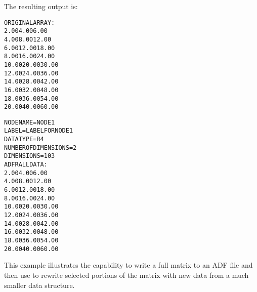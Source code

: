 \noindent
The resulting output is:

\begin{alltt}
   ORIGINAL ARRAY:
             2.00           4.00           6.00
             4.00           8.00          12.00
             6.00          12.00          18.00
             8.00          16.00          24.00
            10.00          20.00          30.00
            12.00          24.00          36.00
            14.00          28.00          42.00
            16.00          32.00          48.00
            18.00          36.00          54.00
            20.00          40.00          60.00

   NODE NAME            = NODE 1
   LABEL                = LABEL FOR NODE 1
   DATA TYPE            = R4
   NUMBER OF DIMENSIONS =            2
   DIMENSIONS           =           10           3
   ADFRALL DATA:
             2.00           4.00           6.00
             4.00           8.00          12.00
             6.00          12.00          18.00
             8.00          16.00          24.00
            10.00          20.00          30.00
            12.00          24.00          36.00
            14.00          28.00          42.00
            16.00          32.00          48.00
            18.00          36.00          54.00
            20.00          40.00          60.00
\end{alltt}


This example illustrates the capability to write a full matrix to an ADF
file and then use  to rewrite selected portions
of the matrix with new data from a much smaller data structure.

